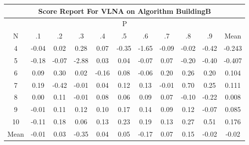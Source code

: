 \documentclass[11pt,a4paper]{report}
\begin{document}
\begin{longtable}{ | c || c | c | c | c | c | c | c | c | c || c |}
\hline
\multicolumn{11}{|c|}{ Score Report For VLNA on Algorithm BuildingB} \\
\hline
\multicolumn{11}{|c|}{ P } \\
\hline
N & .1 & .2 & .3 & .4 & .5 & .6 & .7 & .8 & .9 & Mean\\
 \hline
 \hline
 \endhead
  4 &  \cellcolor[HTML]{FFFFFF} -0.04 &  \cellcolor[HTML]{FFFFFF} 0.02 &  \cellcolor[HTML]{F7F7FF} 0.28 &  \cellcolor[HTML]{FFFFFF} 0.07 &  \cellcolor[HTML]{FFF7F7} -0.35 &  \cellcolor[HTML]{FFD7D7} -1.65 &  \cellcolor[HTML]{FFFFFF} -0.09 &  \cellcolor[HTML]{FFFFFF} -0.02 &  \cellcolor[HTML]{FFF7F7} -0.42 & -0.243 \\
  5 &  \cellcolor[HTML]{FFF7F7} -0.18 &  \cellcolor[HTML]{FFFFFF} -0.07 &  \cellcolor[HTML]{FFB7B7} -2.88 &  \cellcolor[HTML]{FFFFFF} 0.03 &  \cellcolor[HTML]{FFFFFF} 0.04 &  \cellcolor[HTML]{FFFFFF} -0.07 &  \cellcolor[HTML]{FFFFFF} 0.07 &  \cellcolor[HTML]{FFF7F7} -0.20 &  \cellcolor[HTML]{FFF7F7} -0.40 & -0.407 \\
  6 &  \cellcolor[HTML]{FFFFFF} 0.09 &  \cellcolor[HTML]{F7F7FF} 0.30 &  \cellcolor[HTML]{FFFFFF} 0.02 &  \cellcolor[HTML]{FFF7F7} -0.16 &  \cellcolor[HTML]{FFFFFF} 0.08 &  \cellcolor[HTML]{FFFFFF} -0.06 &  \cellcolor[HTML]{F7F7FF} 0.20 &  \cellcolor[HTML]{F7F7FF} 0.26 &  \cellcolor[HTML]{F7F7FF} 0.20 & 0.104 \\
  7 &  \cellcolor[HTML]{F7F7FF} 0.19 &  \cellcolor[HTML]{FFF7F7} -0.42 &  \cellcolor[HTML]{FFFFFF} -0.01 &  \cellcolor[HTML]{FFFFFF} 0.04 &  \cellcolor[HTML]{FFFFFF} 0.12 &  \cellcolor[HTML]{FFFFFF} 0.13 &  \cellcolor[HTML]{FFFFFF} -0.01 &  \cellcolor[HTML]{EFEFFF} 0.70 &  \cellcolor[HTML]{F7F7FF} 0.25 & 0.111 \\
  8 &  \cellcolor[HTML]{FFFFFF} 0.00 &  \cellcolor[HTML]{FFFFFF} 0.11 &  \cellcolor[HTML]{FFFFFF} -0.01 &  \cellcolor[HTML]{FFFFFF} 0.08 &  \cellcolor[HTML]{FFFFFF} 0.06 &  \cellcolor[HTML]{FFFFFF} 0.09 &  \cellcolor[HTML]{FFFFFF} 0.07 &  \cellcolor[HTML]{FFFFFF} -0.10 &  \cellcolor[HTML]{FFF7F7} -0.22 & 0.008 \\
  9 &  \cellcolor[HTML]{FFFFFF} -0.01 &  \cellcolor[HTML]{FFFFFF} 0.11 &  \cellcolor[HTML]{FFFFFF} 0.12 &  \cellcolor[HTML]{FFFFFF} 0.10 &  \cellcolor[HTML]{F7F7FF} 0.17 &  \cellcolor[HTML]{FFFFFF} 0.14 &  \cellcolor[HTML]{FFFFFF} 0.09 &  \cellcolor[HTML]{FFFFFF} 0.12 &  \cellcolor[HTML]{FFFFFF} -0.07 & 0.085 \\
  10 &  \cellcolor[HTML]{FFFFFF} -0.11 &  \cellcolor[HTML]{F7F7FF} 0.18 &  \cellcolor[HTML]{FFFFFF} 0.06 &  \cellcolor[HTML]{FFFFFF} 0.13 &  \cellcolor[HTML]{F7F7FF} 0.23 &  \cellcolor[HTML]{F7F7FF} 0.19 &  \cellcolor[HTML]{FFFFFF} 0.13 &  \cellcolor[HTML]{F7F7FF} 0.27 &  \cellcolor[HTML]{EFEFFF} 0.51 & 0.176 \\
 \hline
 \hline
Mean &  \cellcolor[HTML]{FFFFFF} -0.01 &  \cellcolor[HTML]{FFFFFF} 0.03 &  \cellcolor[HTML]{FFF7F7} -0.35 &  \cellcolor[HTML]{FFFFFF} 0.04 &  \cellcolor[HTML]{FFFFFF} 0.05 &  \cellcolor[HTML]{FFF7F7} -0.17 &  \cellcolor[HTML]{FFFFFF} 0.07 &  \cellcolor[HTML]{FFFFFF} 0.15 &  \cellcolor[HTML]{FFFFFF} -0.02 &  \cellcolor[HTML]{FFFFFF} -0.02
\end{longtable}
\end{document}
